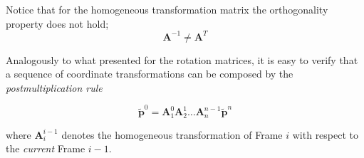 \documentclass[10pt]{article}
\begin{document}
Notice that for the homogeneous transformation matrix the orthogonality property does not hold; 
$$
\boldsymbol{A}^{-1} \neq \boldsymbol{A}^{T}
$$


Analogously to what presented for the rotation matrices, it is easy to verify that a sequence of coordinate transformations can be composed by the \emph{postmultiplication rule}

$$
\widetilde{\boldsymbol{p}}^{0}=\boldsymbol{A}_{1}^{0} \boldsymbol{A}_{2}^{1} \ldots \boldsymbol{A}_{n}^{n-1} \widetilde{\boldsymbol{p}}^{n}
$$

where $\boldsymbol{A}_{i}^{i-1}$ denotes the homogeneous transformation of Frame $i$ with respect to the \emph{current} Frame $i-1$.
\end{document}
